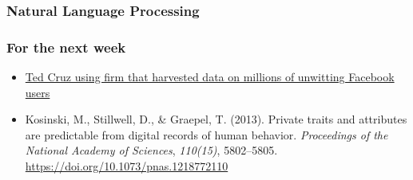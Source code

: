 \documentclass{beamer}
\begin{document}
\begin{frame}
    \frametitle{Natural Language Processing}
\end{frame}

\begin{frame}
    \frametitle{For the next week}
    \begin{itemize}
       \item \textcolor{blue}{\href{https://www.theguardian.com/us-news/2015/dec/11/senator-ted-cruz-president-campaign-facebook-user-data}{Ted Cruz using firm that harvested data on millions of unwitting Facebook users}}
       \item Kosinski, M., Stillwell, D., \& Graepel, T. (2013). Private traits and attributes are predictable from digital records of human behavior. \textit{Proceedings of the National Academy of Sciences}, \textit{110(15)}, 5802–5805. \textcolor{blue}{\href{https://doi.org/10.1073/pnas.1218772110}{https://doi.org/10.1073/pnas.1218772110}}
    \end{itemize}
    
\end{frame}
\end{document}
